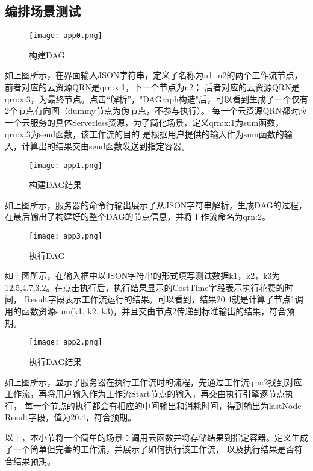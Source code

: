 \subsection{编排场景测试}

\begin{figure}[H]
    \centering
    \texttt{[image: app0.png]}
    \caption{构建DAG}
    \label{fig:6-3-2-1}
\end{figure}

如上图所示，在界面输入JSON字符串，定义了名称为n1, n2的两个工作流节点，前者对应的云资源QRN是qrn:x:1，下一个节点为n2；
后者对应的云资源QRN是qrn:x:3，为最终节点。点击“解析”，"DAGraph构造"后，可以看到生成了一个仅有2个节点有向图（dummy节点为伪节点，不参与执行）。
每一个云资源QRN都对应一个云服务的具体Serverless资源，为了简化场景，定义qrn:x:1为sum函数，qrn:x:3为send函数，该工作流的目的
是根据用户提供的输入作为sum函数的输入，计算出的结果交由send函数发送到指定容器。

\begin{figure}[H]
    \centering
    \texttt{[image: app1.png]}
    \caption{构建DAG结果}
    \label{fig:6-3-2-2}
\end{figure}
如上图所示，服务器的命令行输出展示了从JSON字符串解析，生成DAG的过程，在最后输出了构建好的整个DAG的节点信息，并将工作流命名为qrn:2。


\begin{figure}[H]
    \centering
    \texttt{[image: app3.png]}
    \caption{执行DAG}
    \label{fig:6-3-2-3}
\end{figure}
如上图所示，在输入框中以JSON字符串的形式填写测试数据k1，k2，k3为12.5,4.7,3.2。在点击执行后，执行结果显示的CostTime字段表示执行花费的时间，
Result字段表示工作流运行的结果。可以看到，结果20.4就是计算了节点1调用的函数资源sum(k1, k2, k3)，并且交由节点2传递到标准输出的结果，符合预期。

\begin{figure}[H]
    \centering
    \texttt{[image: app2.png]}
    \caption{执行DAG结果}
    \label{fig:6-3-2-4}
\end{figure}
如上图所示，显示了服务器在执行工作流时的流程，先通过工作流qrn:2找到对应工作流，再将用户输入作为工作流Start节点的输入，再交由执行引擎逐节点执行，
每一个节点的执行都会有相应的中间输出和消耗时间，得到输出为lastNode-Result字段，值为20.4，符合预期。

以上，本小节将一个简单的场景：调用云函数并将存储结果到指定容器。定义生成了一个简单但完善的工作流，并展示了如何执行该工作流，
以及执行结果是否符合结果预期。

